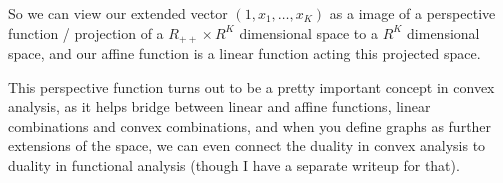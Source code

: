 \documentclass[a4paper]{article}
\begin{document}
So we can view our extended vector $ ( 1, x_1, \ldots, x_K) $ as a image of a perspective function / projection of a $R_{++} \times R^{K}$ dimensional space to a $R^K$ dimensional space, and our affine function is a linear function acting this projected space.

This perspective function turns out to be a pretty important concept in convex analysis, as it helps bridge between linear and affine functions, linear combinations and convex combinations, and when you define graphs as further extensions of the space, we can even connect the duality in convex analysis to duality in functional analysis (though I have a separate writeup for that).
\end{document}
